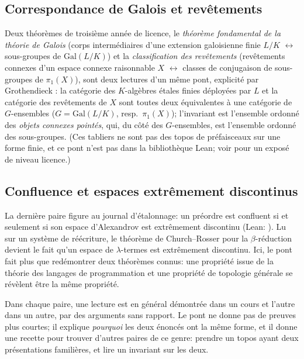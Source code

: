 \subsection{Correspondance de Galois et revêtements}

Deux théorèmes de troisième année de licence, le \emph{théorème fondamental de la théorie de Galois} (corps intermédiaires d'une extension galoisienne finie $L/K$ $\leftrightarrow$ sous-groupes de $\mathrm{Gal}(L/K)$) et la \emph{classification des revêtements} (revêtements connexes d'un espace connexe raisonnable $X$ $\leftrightarrow$ classes de conjugaison de sous-groupes de $\pi_1(X)$), sont deux lectures d'un même pont, explicité par Grothendieck \cite{sga1}: la catégorie des $K$-algèbres étales finies déployées par $L$ et la catégorie des revêtements de $X$ sont toutes deux équivalentes à une catégorie de $G$-ensembles ($G = \mathrm{Gal}(L/K)$, resp.\ $\pi_1(X)$); l'invariant est l'ensemble ordonné des \emph{objets connexes pointés}, qui, du côté des $G$-ensembles, est l'ensemble ordonné des sous-groupes. (Ces tabliers ne sont pas des topos de préfaisceaux sur une forme finie, et ce pont n'est pas dans la bibliothèque Lean; voir \cite{szamuely} pour un exposé de niveau licence.)

\subsection{Confluence et espaces extrêmement discontinus}

La dernière paire figure au journal d'étalonnage: un préordre est confluent si et seulement si son espace d'Alexandrov est extrêmement discontinu \cite[Prop.~7.10]{caramello-stone} (Lean: ). Lu sur un système de réécriture, le théorème de Church--Rosser pour la $\beta$-réduction devient le fait qu'un espace de $\lambda$-termes est extrêmement discontinu. Ici, le pont fait plus que redémontrer deux théorèmes connus: une propriété issue de la théorie des langages de programmation et une propriété de topologie générale se révèlent être la même propriété.

\begin{remark}
Dans chaque paire, une lecture est en général démontrée dans un cours et l'autre dans un autre, par des arguments sans rapport. Le pont ne donne pas de preuves plus courtes; il explique \emph{pourquoi} les deux énoncés ont la même forme, et il donne une recette pour trouver d'autres paires de ce genre: prendre un topos ayant deux présentations familières, et lire un invariant sur les deux.
\end{remark}
